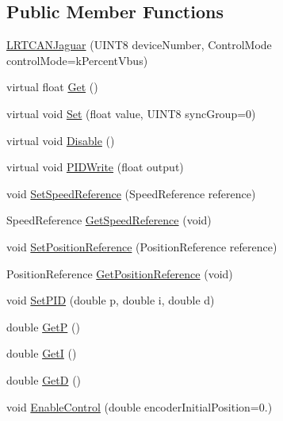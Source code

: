 \subsection*{\-Public \-Member \-Functions}
\begin{DoxyCompactItemize}
\item 
\hyperlink{class_l_r_t_c_a_n_jaguar_a12b2f40b918492e3cbdeddc658e70047}{\-L\-R\-T\-C\-A\-N\-Jaguar} (\-U\-I\-N\-T8 device\-Number, \-Control\-Mode control\-Mode=k\-Percent\-Vbus)
\item 
virtual float \hyperlink{class_l_r_t_c_a_n_jaguar_adbff221c0f9c7486fbd88a894a4ea388}{\-Get} ()
\item 
virtual void \hyperlink{class_l_r_t_c_a_n_jaguar_a28a3c74d34e8997fa59a82960cf97e2d}{\-Set} (float value, \-U\-I\-N\-T8 sync\-Group=0)
\item 
virtual void \hyperlink{class_l_r_t_c_a_n_jaguar_a76ebe3546f5d74d2bf223ff7773b2022}{\-Disable} ()
\item 
virtual void \hyperlink{class_l_r_t_c_a_n_jaguar_ae3439d6c1889e682e5264f0885535b72}{\-P\-I\-D\-Write} (float output)
\item 
void \hyperlink{class_l_r_t_c_a_n_jaguar_a51d04b4fca05ee687493989f3f6eb055}{\-Set\-Speed\-Reference} (\-Speed\-Reference reference)
\item 
\-Speed\-Reference \hyperlink{class_l_r_t_c_a_n_jaguar_aa241f31f3237786a6e95c6bd4c83e79f}{\-Get\-Speed\-Reference} (void)
\item 
void \hyperlink{class_l_r_t_c_a_n_jaguar_a8fa377ad73a5bee7f6771fab4bb0116f}{\-Set\-Position\-Reference} (\-Position\-Reference reference)
\item 
\-Position\-Reference \hyperlink{class_l_r_t_c_a_n_jaguar_a2b3818a7988487892ef85c7fe9e8d9dc}{\-Get\-Position\-Reference} (void)
\item 
void \hyperlink{class_l_r_t_c_a_n_jaguar_ad03505bc4d67dc19cc77b90560d8e22e}{\-Set\-P\-I\-D} (double p, double i, double d)
\item 
double \hyperlink{class_l_r_t_c_a_n_jaguar_a2953bd120c5d818e52308f654c4aa3e1}{\-Get\-P} ()
\item 
double \hyperlink{class_l_r_t_c_a_n_jaguar_acc42ca55def0c9271b8753ca7d9e5334}{\-Get\-I} ()
\item 
double \hyperlink{class_l_r_t_c_a_n_jaguar_ac09f09fc4e99035db3c821ad00cac1db}{\-Get\-D} ()
\item 
void \hyperlink{class_l_r_t_c_a_n_jaguar_accaa0c3284b3d50ed8113eb3055fa289}{\-Enable\-Control} (double encoder\-Initial\-Position=0.)

\end{DoxyCompactItemize}
